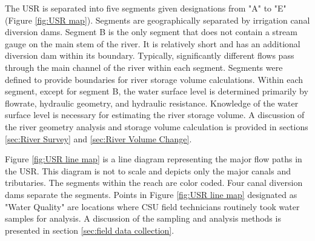 
The USR is separated into five segments given designations from "A" to "E" (Figure \ref{fig:USR map}).  Segments are geographically separated by irrigation canal diversion dams.  Segment B is the only segment that does not contain a stream gauge on the main stem of the river.  It is relatively short and has an additional diversion dam within its boundary.  Typically, significantly different flows pass through the main channel of the river within each segment.  Segments were defined to provide boundaries for river storage volume calculations.  Within each segment, except for segment B, the water surface level is determined primarily by flowrate, hydraulic geometry, and hydraulic resistance.  Knowledge of the water surface level is necessary for estimating the river storage volume.  A discussion of the river geometry analysis and storage volume calculation is provided in sections \ref{sec:River Survey} and \ref{sec:River Volume Change}. 

Figure \ref{fig:USR line map} is a line diagram representing the major flow paths in the USR.  This diagram is not to scale and depicts only the major canals and tributaries.  The segments within the reach are color coded.  Four canal diversion dams separate the segments.  Points in Figure \ref{fig:USR line map} designated as "Water Quality" are locations where CSU field technicians routinely took water samples for analysis.  A discussion of the sampling and analysis methods is presented in section \ref{sec:field data collection}.

